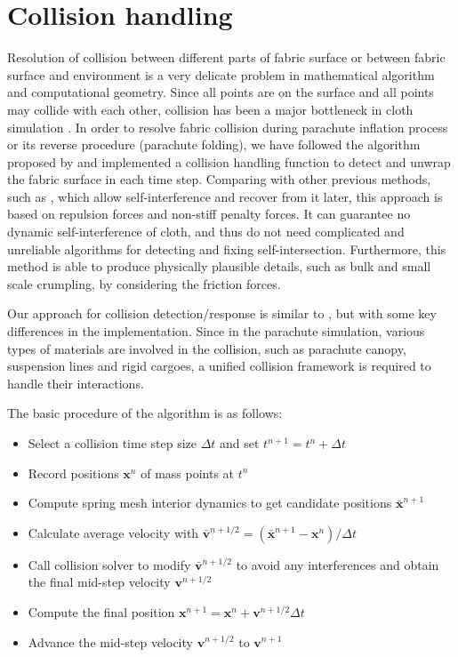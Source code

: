 \section{Collision handling}
Resolution of collision between different parts of
fabric surface or between fabric surface and environment is a very delicate
problem in mathematical algorithm and computational geometry. Since all points 
are on the surface and all points may collide with each other, collision has been 
a major bottleneck in cloth simulation \cite{BridsonRobust2002}. In order to resolve fabric collision during parachute inflation process or its reverse procedure (parachute folding), we have followed the algorithm proposed by \cite{BridsonRobust2002} and implemented a collision handling function to detect and unwrap the fabric surface in each time step. Comparing with other previous methods, such as \cite{Provot1997, Volino1995}, which allow self-interference and recover from it later, this approach is based on repulsion forces and non-stiff penalty forces. It can guarantee no dynamic self-interference of cloth, and thus do not need complicated and unreliable algorithms for detecting and fixing self-intersection. Furthermore, this method is able to produce physically plausible details, such as bulk and small scale crumpling, by considering the friction forces.

Our approach for collision detection/response is similar to \cite{BridsonRobust2002}, but with some key differences in the implementation. Since in the parachute simulation, various types of materials are involved in the collision, such as parachute canopy, suspension lines and rigid cargoes, a unified collision framework is required to handle their interactions. 
 
The basic procedure of the algorithm is as follows:
\begin{itemize}
\item Select a collision time step size $\Delta t$ and set $t^{n+1}=t^{n}+\Delta t$
\item Record positions $\mathbf{x}^n$ of mass points at $t^n$
\item Compute spring mesh interior dynamics to get candidate positions
$\bar{\mathbf{x}}^{n+1}$
\item Calculate average velocity with
$\bar{\mathbf{v}}^{n+1/2} = (\bar{\mathbf{x}}^{n+1}-\mathbf{x}^n)/\Delta t$
\item Call collision solver to modify $\bar{\mathbf{v}}^{n+1/2}$ to avoid any interferences and obtain the final mid-step velocity $\mathbf{v}^{n+1/2}$
\item Compute the final position
$\mathbf{x}^{n+1} = \mathbf{x}^n+\mathbf{v}^{n+1/2}\Delta t$
\item Advance the mid-step velocity $\mathbf{v}^{n+1/2}$ to $\mathbf{v}^{n+1}$ \end{itemize}

